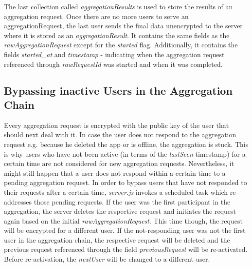 \begin{samepage}
The last collection called \textit{aggregationResults} is used to store the results of an aggregation request. Once there are no more users to serve an aggregationRequest, the last user sends the final data unencrypted to the server where it is stored as an \textit{aggregationResult}. It contains the same fields as the \textit{rawAggregationRequest} except for the \textit{started} flag. Additionally, it contains the fields \textit{started\_at} and \textit{timestamp} - indicating when the aggregation request referenced through \textit{rawRequestId} was started and when it was completed.
\end{samepage}

\subsection{Bypassing inactive Users in the Aggregation Chain}\label{request-chain}
Every aggregation request is encrypted with the public key of the user that should next deal with it. In case the user does not respond to the aggregation request e.g. because he deleted the app or is offline, the aggregation is stuck. This is why users who have not been active (in terms of the \textit{lastSeen} timestamp) for a certain time are not considered for new aggregation requests. Nevertheless, it might still happen that a user does not respond within a certain time to a pending aggregation request. In order to bypass users that have not responded to their requests after a certain time, \textit{server.js} invokes a scheduled task which re-addresses those pending requests. If the user was the first participant in the aggregation, the server deletes the respective request and initiates the request again based on the initial \textit{rawAggregationRequest}. This time though, the request will be encrypted for a different user. If the not-responding user was not the first user in the aggregation chain, the respective request will be deleted and the previous request referenced through the field \textit{previousRequest} will be re-activated. Before re-activation, the \textit{nextUser} will be changed to a different user.
